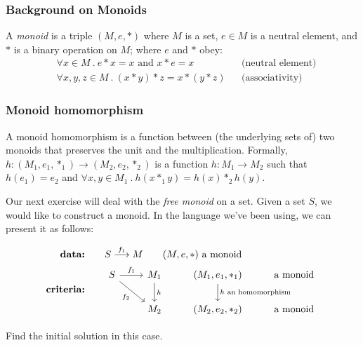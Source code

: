 \subsubsection*{Background on Monoids}

A \emph{monoid} is a triple $(M, e, \ast)$ where $M$ is a set, $e \in M$ is a
neutral element, and $\ast$ is a binary operation on $M$; where $e$ and $\ast$
obey:
\begin{align*}
    & \forall x \in M\ .\ 
    e \ast x = x \text{ and } x \ast e = x && \text{(neutral
    element)} \\
    & \forall x,y,z \in M\ .\ 
    (x \ast y) \ast z = x \ast (y \ast z) && \text{(associativity)}
\end{align*}

\subsubsection*{Monoid homomorphism}

A monoid homomorphism is a function between (the underlying sets of) two
monoids that preserves the unit and the multiplication. Formally,
$h : (M_1, e_1, \ast_1) \rightarrow (M_2, e_2, \ast_2)$ is a function
$h: M_1\to M_2$ such that $h(e_1) = e_2$ and
$\forall x, y \in M_1\ .\ h(x \ast_1 y) = h(x) \ast_2 h(y)$.

Our next exercise will deal with the \emph{free monoid} on a set.
Given a set $S$, we would like to construct a monoid. In the language we've
been using, we can present it as follows:

\begin{align*}
    \textbf{data:}\qquad& S \overset{f_1}{\longrightarrow}M
    \qquad \text{$(M,e,\ast)$ a monoid}\\
    \textbf{criteria:}\qquad& \begin{tikzcd}[ampersand replacement=\&]
        S \arrow[r, "f_1"] \arrow[dr, swap, "f_2"] \& 
        M_1 
        \arrow[d, "h"] 
        \& (M_1,e_1,\ast_1) 
        \arrow[d, "\text{$h$ an homomorphism}"] 
        \& \text{a monoid}
        \\
        {}  
        \& M_2 \& (M_2,e_2,\ast_2) \& \text{a monoid}
    \end{tikzcd}
\end{align*}

\begin{exercise}
    Find the initial solution in this case.
\end{exercise}


